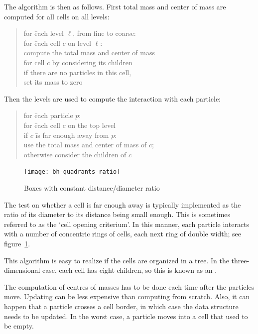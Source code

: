 The algorithm is then as follows. First total mass and center of mass
are computed for all cells on all levels:
\begin{quotation}
  \begin{tabbing}
    for \=each level $\ell$, from fine to coarse:\\
    \>for \=each cell $c$ on level $\ell$:\\
    \>\> compute \=the total mass and center of mass\\
    \>\>\> for cell $c$ by considering its children\\
    \> if there are no particles in this cell,\\
    \>\> set its mass to zero
  \end{tabbing}
\end{quotation}
Then the levels are used to compute the interaction with each particle:
\begin{quotation}
  \begin{tabbing}
    for \=each particle $p$:\\
    \>for \=each cell $c$ on the top level\\
    \>\>if $c$ \=is far enough away from $p$:\\
    \>\>\>use the total mass and center of mass of $c$;\\
    \>\>otherwise consider the children of $c$
  \end{tabbing}
\end{quotation}

\begin{figure}
\texttt{[image: bh-quadrants-ratio]}
\caption{Boxes with constant distance/diameter ratio}
\label{fig:bh-cellratio}
\end{figure}
%
The test on whether a cell is far enough away is typically implemented
as the ratio of its diameter to its distance being small enough. This
is sometimes referred to as the `cell opening criterium'. In this manner, 
each particle interacts with a number of concentric rings of cells,
each next ring of double width; see figure~\ref{fig:bh-cellratio}.

This algorithm is easy to realize if the cells are
organized in a tree. In the three-dimensional case, each cell has
eight children, so this is known as an .

The computation of centres of masses has to be done each time after
the particles move. Updating can be less expensive than computing from
scratch. Also, it can happen that a particle crosses a cell border, in
which case the data structure needs to be updated. In the worst case,
a particle moves into a cell that used to be empty.

